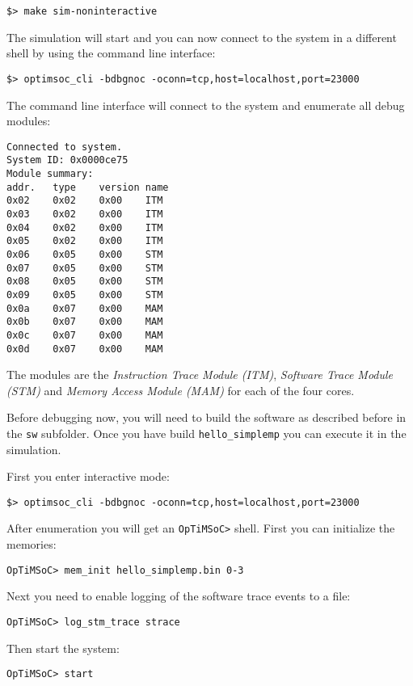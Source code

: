 \begin{lstlisting}
$> make sim-noninteractive
\end{lstlisting}

The simulation will start and you can now connect
to the system in a different shell by using the command line
interface:

\begin{lstlisting}
$> optimsoc_cli -bdbgnoc -oconn=tcp,host=localhost,port=23000
\end{lstlisting}

The command line interface will connect to the system and enumerate
all debug modules:

\begin{lstlisting}
Connected to system.
System ID: 0x0000ce75
Module summary:
addr.	type	version	name
0x02	0x02	0x00	ITM
0x03	0x02	0x00	ITM
0x04	0x02	0x00	ITM
0x05	0x02	0x00	ITM
0x06	0x05	0x00	STM
0x07	0x05	0x00	STM
0x08	0x05	0x00	STM
0x09	0x05	0x00	STM
0x0a	0x07	0x00	MAM
0x0b	0x07	0x00	MAM
0x0c	0x07	0x00	MAM
0x0d	0x07	0x00	MAM
\end{lstlisting}

The modules are the \emph{Instruction Trace Module (ITM)},
\emph{Software Trace Module (STM)} and \emph{Memory Access Module
  (MAM)} for each of the four cores.

Before debugging now, you will need to build the software as described
before in the \verb|sw| subfolder. Once you have build
\verb|hello_simplemp| you can execute it in the simulation.

First you enter interactive mode:

\begin{lstlisting}
$> optimsoc_cli -bdbgnoc -oconn=tcp,host=localhost,port=23000
\end{lstlisting}

After enumeration you will get an \verb|OpTiMSoC>| shell. First you
can initialize the memories:

\begin{lstlisting}
OpTiMSoC> mem_init hello_simplemp.bin 0-3
\end{lstlisting}

Next you need to enable logging of the software trace events to a
file:

\begin{lstlisting}
OpTiMSoC> log_stm_trace strace
\end{lstlisting}

Then start the system:
\begin{lstlisting}
OpTiMSoC> start
\end{lstlisting}

